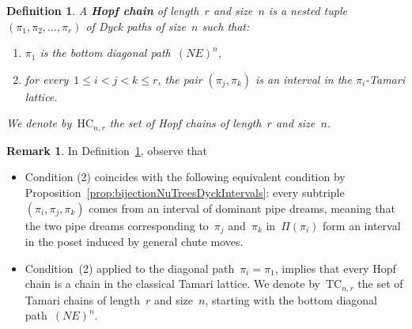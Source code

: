\documentclass{amsart}
\newtheorem{definition}[theorem]{Definition}
\theoremstyle{definition}
\newtheorem{remark}[theorem]{Remark}
\newcommand{\defn}[1]{\textbf{\textsf{\color{PineGreen} #1}}} %
\newcommand{\pipeDreams}{\Pi} %
\newcommand{\TC}[2]{\mathrm{TC}_{#1,#2}} %
\newcommand{\HC}[2]{\mathrm{HC}_{#1,#2}} %
\begin{document}
\begin{definition}
\label{def:HopfChains}
A \defn{Hopf chain} of length~$r$ and size~$n$ is a nested tuple $(\pi_1,\pi_2,\dots ,\pi_r)$ of Dyck paths of size~$n$ such that:
\begin{enumerate}
\item $\pi_1$ is the bottom diagonal path~$(NE)^n$,
\item for every~$1 \le i < j < k \le r$, the pair $(\pi_j,\pi_k)$ is an interval in the $\pi_i$-Tamari lattice.
\end{enumerate}
We denote by~$\HC{n}{r}$ the set of Hopf chains of length~$r$ and size~$n$.
\end{definition}

\begin{remark}
In Definition~\ref{def:HopfChains}, observe that
\begin{itemize}
\item Condition (2)  coincides with the following equivalent condition by Proposition~\ref{prop:bijectionNuTreesDyckIntervals}: every subtriple~$(\pi_i,\pi_j,\pi_k)$ comes from an interval of dominant pipe dreams, meaning that the two pipe dreams corresponding to~$\pi_j$ and~$\pi_k$ in~$\pipeDreams(\pi_i)$ form an interval in the poset induced by general chute moves.
\item Condition~(2) applied to the diagonal path~$\pi_i = \pi_1$, implies that every Hopf chain is a chain in the classical Tamari lattice. We denote by~$\TC{n}{r}$ the set of Tamari chains of length~$r$ and size~$n$, starting with the bottom diagonal path~$(NE)^n$.
\end{itemize}
\end{remark}
\end{document}
